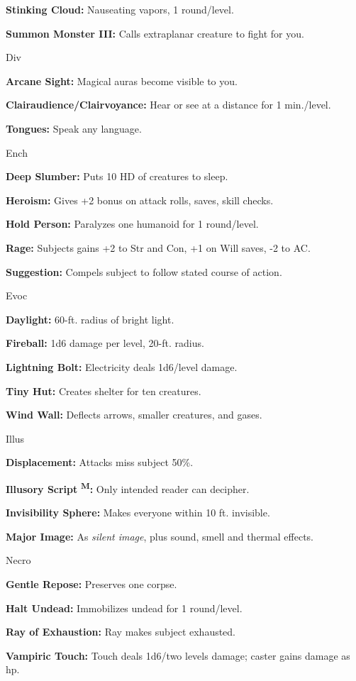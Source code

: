 \documentclass{article}
\begin{document}
\textbf{Stinking Cloud:} Nauseating vapors, 1 round/level.

\textbf{Summon Monster III:} Calls extraplanar creature to fight for you.

Div

\textbf{Arcane Sight:} Magical auras become visible to you.

\textbf{Clairaudience/Clairvoyance:} Hear or see at a distance for 1 min./level.

\textbf{Tongues:} Speak any language.

Ench

\textbf{Deep Slumber:} Puts 10 HD of creatures to sleep.

\textbf{Heroism:} Gives +2 bonus on attack rolls, saves, skill checks.

\textbf{Hold Person:} Paralyzes one humanoid for 1 round/level.

\textbf{Rage:} Subjects gains +2 to Str and Con, +1 on Will saves, -2 to AC.

\textbf{Suggestion:} Compels subject to follow stated course of action.

Evoc

\textbf{Daylight:} 60-ft. radius of bright light.

\textbf{Fireball:} 1d6 damage per level, 20-ft. radius.

\textbf{Lightning Bolt:} Electricity deals 1d6/level damage.

\textbf{Tiny Hut:} Creates shelter for ten creatures.

\textbf{Wind Wall:} Deflects arrows, smaller creatures, and gases.

Illus

\textbf{Displacement:} Attacks miss subject 50\%.

\textbf{Illusory Script }\textsuperscript{\textbf{M}}\textbf{:} Only intended reader 
can decipher.

\textbf{Invisibility Sphere:} Makes everyone within 10 ft. invisible.

\textbf{Major Image:} As \textit{silent image}, plus sound, smell and thermal effects.

Necro

\textbf{Gentle Repose:} Preserves one corpse.

\textbf{Halt Undead:} Immobilizes undead for 1 round/level.

\textbf{Ray of Exhaustion:} Ray makes subject exhausted.

\textbf{Vampiric Touch:} Touch deals 1d6/two levels damage; caster gains damage 
as hp.
\end{document}
